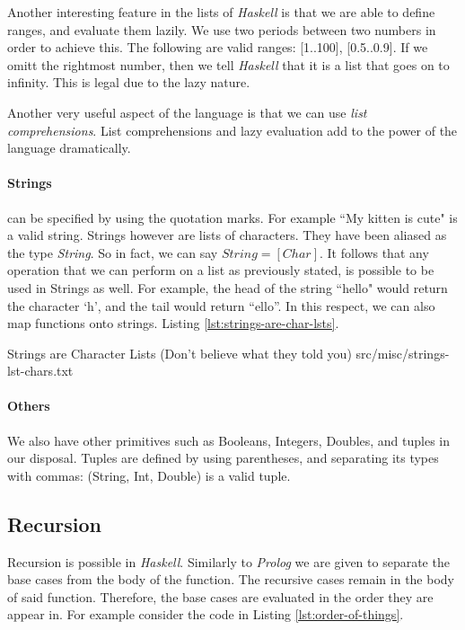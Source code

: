 
Another interesting feature in the lists of \textit{Haskell} is that we are
able to define ranges, and evaluate them lazily. We use two periods between two
numbers in order to achieve this. The following are valid ranges: [1..100],
[0.5..0.9]. If we omitt the rightmost number, then we tell \textit{Haskell}
that it is a list that goes on to infinity. This is legal due to the lazy
nature.

Another very useful aspect of the language is that we can use \textit{list 
comprehensions}. List comprehensions and lazy evaluation add to the power of 
the language dramatically.

\paragraph{Strings} can be specified by using the quotation marks. For example
``My kitten is cute" is a valid string. Strings however are lists of characters.
They have been aliased as the type \textit{String}. So in fact, we can say $
String = [Char]$. It follows that any operation that we can perform on a list
as previously stated, is possible to be used in Strings as well. For example, 
the head of the string ``hello" would return the character `h', and the tail
would return ``ello''. In this respect, we can also map functions onto strings.
Listing \ref{lst:strings-are-char-lsts}.

%
            {Strings are Character Lists (Don't believe what they told you)}%
            {src/misc/strings-lst-chars.txt}

\paragraph{Others} We also have other primitives such as Booleans, 
Integers, Doubles, and tuples in our disposal. Tuples are defined by using 
parentheses, and separating its types with commas: (String, Int, Double) is a 
valid tuple. 

\subsection{Recursion}

Recursion is possible in \textit{Haskell}. Similarly to \textit{Prolog} we are
given to separate the base cases from the body of the function. The recursive
cases remain in the body of said function. Therefore, the base cases are
evaluated in the order they are appear in. For example consider the code in
Listing \ref{lst:order-of-things}. 

